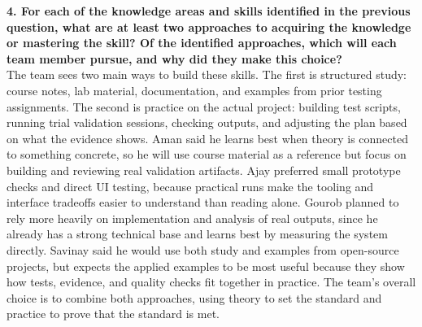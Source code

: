 \documentclass[12pt, titlepage]{article}
\begin{document}
\vspace{0.75em}

\noindent\textbf{4. For each of the knowledge areas and skills identified in
the previous question, what are at least two approaches to acquiring the
knowledge or mastering the skill? Of the identified approaches, which will
each team member pursue, and why did they make this choice?}\\
The team sees two main ways to build these skills. The first is structured
study: course notes, lab material, documentation, and examples from prior
testing assignments. The second is practice on the actual project: building
test scripts, running trial validation sessions, checking outputs, and
adjusting the plan based on what the evidence shows. Aman said he learns
best when theory is connected to something concrete, so he will use course
material as a reference but focus on building and reviewing real validation
artifacts. Ajay preferred small prototype checks and direct UI testing,
because practical runs make the tooling and interface tradeoffs easier to
understand than reading alone. Gourob planned to rely more heavily on
implementation and analysis of real outputs, since he already has a strong
technical base and learns best by measuring the system directly. Savinay said
he would use both study and examples from open-source projects, but expects
the applied examples to be most useful because they show how tests, evidence,
and quality checks fit together in practice. The team’s overall choice is to
combine both approaches, using theory to set the standard and practice to
prove that the standard is met.
\end{document}
